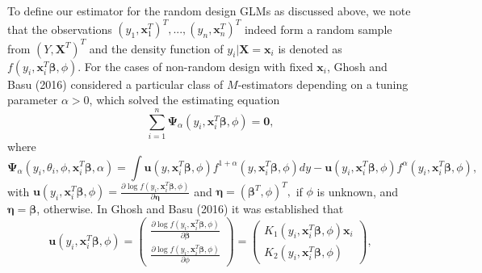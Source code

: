 \documentclass[a4paper]{article}%
\begin{document}
To define our estimator for the random design GLMs as discussed above, 
we note that the observations  $(y_{1},\boldsymbol{x}_{1}^{T})^{T},...,(y_{n},\boldsymbol{x}_{n}^{T})^{T}$ 
indeed form a random sample from $(Y,\boldsymbol{X}^{T})^{T}$
and  
the density function of $y_{i}|\boldsymbol{X=x}_{i}$ is denoted as $f(y_{i},\boldsymbol{x}_{i}^{T}\boldsymbol{\beta},\phi)$. 
For the cases of non-random design with fixed $\boldsymbol{x}_i$,  Ghosh and Basu (2016) considered a particular class of 
$M$-estimators depending  on a tuning parameter $\alpha>0$, which solved the estimating equation %
\[%
{\displaystyle\sum\limits_{i=1}^{n}}
\boldsymbol{\Psi}_{\alpha}(y_{i},\boldsymbol{x}_{i}^{T}\boldsymbol{\beta}%
,\phi)=\boldsymbol{0},
\]
where
\begin{equation}
\boldsymbol{\Psi}_{\alpha}\left(  y_{i},\theta_{i},\phi,\boldsymbol{x}_{i}%
^{T}\boldsymbol{\beta},\alpha\right)  =%
{\displaystyle\int}
\boldsymbol{u}(y,\boldsymbol{x}_{i}^{T}\boldsymbol{\beta},\phi)f^{1+\alpha
}(y,\boldsymbol{x}_{i}^{T}\boldsymbol{\beta},\phi)dy-\boldsymbol{u}%
(y_{i},\boldsymbol{x}_{i}^{T}\boldsymbol{\beta},\phi)f^{\alpha}(y_{i}%
,\boldsymbol{x}_{i}^{T}\boldsymbol{\beta},\phi), \label{2}%
\end{equation}
with $
\boldsymbol{u}(y_{i},\boldsymbol{x}_{i}^{T}\boldsymbol{\beta},\phi
)=\frac{\partial\log f(y_{i},\boldsymbol{x}_{i}^{T}\boldsymbol{\beta},\phi
)}{\partial\boldsymbol{\eta}}
$
and
$
\boldsymbol{\eta}=(\boldsymbol{\beta}^{T},\phi)^{T},
$
if $\phi$ is unknown, and $\boldsymbol{\eta}=\boldsymbol{\beta}$, otherwise.
In Ghosh and Basu (2016) it was established that
\[
\boldsymbol{u}(y_{i},\boldsymbol{x}_{i}^{T}\boldsymbol{\beta},\phi)=%
\begin{pmatrix}
\frac{\partial\log f(y_{i},\boldsymbol{x}_{i}^{T}\boldsymbol{\beta},\phi
)}{\partial\boldsymbol{\beta}}\\
\frac{\partial\log f(y_{i},\boldsymbol{x}_{i}^{T}\boldsymbol{\beta},\phi
)}{\partial\phi}%
\end{pmatrix}
=%
\begin{pmatrix}
K_{1}(y_{i},\boldsymbol{x}_{i}^{T}\boldsymbol{\beta},\phi)\boldsymbol{x}_{i}\\
K_{2}(y_{i},\boldsymbol{x}_{i}^{T}\boldsymbol{\beta},\phi)
\end{pmatrix}
,
\]
\end{document}
